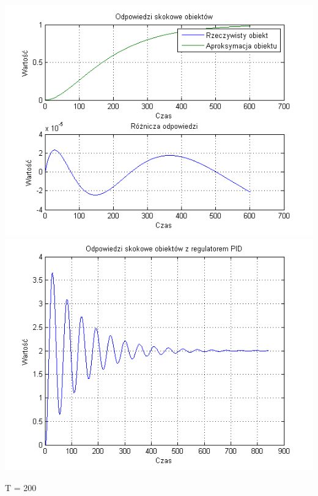 \documentclass[10pt,a4paper]{article}
\begin{document}
\begin{center}
\includegraphics[scale=1]{images/dwa/skrypt_79.png}\\
\includegraphics[scale=1]{images/dwa/skrypt_80.png}\\
\end{center}
\newpage
T = 200
\end{document}
